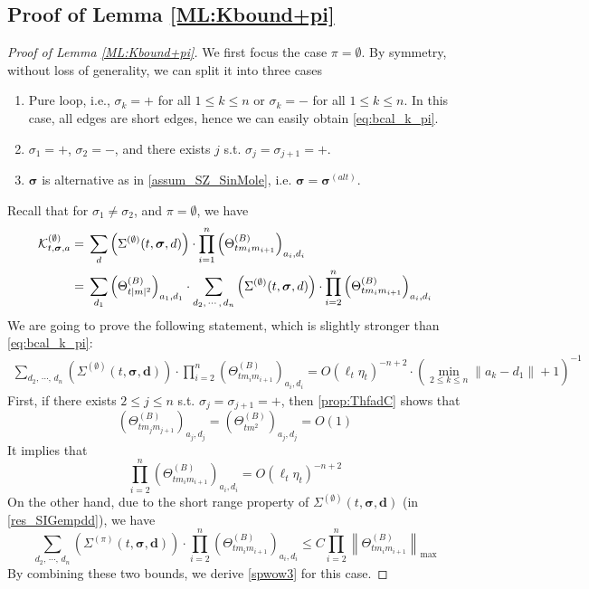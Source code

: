 \documentclass[10pt,reqno]{article}
\theoremstyle{plain} %
\theoremstyle{remark}
\numberwithin{equation}{section}
\begin{document}
\subsection{Proof of Lemma   \ref{ML:Kbound+pi}}

\begin{proof}[Proof of Lemma  \ref{ML:Kbound+pi}]
 We first focus the case $\pi=\emptyset$. By symmetry, without loss of generality, we can split it into three cases
 \begin{enumerate}
     \item Pure loop, i.e., $\sigma_k=+$ for all $1\le k\le n$ or  $\sigma_k=-$ for all $1\le k\le n$. In this case, all edges are short edges, hence we can easily obtain \eqref{eq:bcal_k_pi}. 
     \item $\sigma_1=+$, $\sigma_2=-$, and  there exists $j$ s.t. $\sigma_j=\sigma_{j+1}=+$. 
    \item $\boldsymbol{\sigma}$ is alternative as in \eqref{assum_SZ_SinMole}, i.e. $\boldsymbol{\sigma}=\boldsymbol{\sigma}^{(alt)}$. 
 \end{enumerate}
  Recall  that for $\sigma_1\ne\sigma_2$, and $\pi=\emptyset$, we have 
\begin{align*}
{\cal K}^{(\emptyset)}_{t, \boldsymbol{\sigma}, \textbf{a}}
=\;&
 \sum_{\textbf{d}}\left(\Sigma^{(\emptyset)}(t, \boldsymbol{\sigma}, \textbf{d})\right)
\cdot 
\prod_{i=1}^n \left(\Theta^{(B)}_{tm_im_{i+1}}\right)_{a_i, d_i}
\\\nonumber
=\;&\sum_{d_1}\left(\Theta^{(B)}_{t|m|^2}\right)_{a_1, d_1}
\cdot \sum_{d_2,\,\cdots,\, d_n}\left(\Sigma^{(\emptyset)}(t, \boldsymbol{\sigma}, \textbf{d})\right)
\cdot 
\prod_{i=2}^n \left(\Theta^{(B)}_{tm_im_{i+1}}\right)_{a_i, d_i}  
\end{align*}
We are going to prove the following statement, which is  slightly stronger than \eqref{eq:bcal_k_pi}:
\begin{align}\label{spwow3}
    \sum_{d_2,\,\cdots,\, d_n}\left(\Sigma^{(\emptyset)}(t, \boldsymbol{\sigma}, \textbf{d})\right)
\cdot 
\prod_{i=2}^n \left(\Theta^{(B)}_{tm_im_{i+1}}\right)_{a_i, d_i}
=O(\ell_t\eta_t)^{-n+2}\cdot \left(\min_{2\le k\le n} \|a_k-d_1\|+1\right)^{-1}
\end{align}
First, if there exists $2\le j\le n$ s.t.  $\sigma_j=\sigma_{j+1}=+$, then  \eqref{prop:ThfadC} shows that  
$$
\left(\Theta^{(B)}_{tm_jm_{j+1}}\right)_{a_j, d_j}= \left(\Theta^{(B)}_{tm^2}\right)_{a_j, d_j}=O(1)
$$
It implies that
$$
\prod_{i=2}^n \left(\Theta^{(B)}_{tm_im_{i+1}}\right)_{a_i, d_i}=O(\ell_t\eta_t)^{-n+2}
$$
On the other hand, due to the short range property of $\Sigma^{(\emptyset)}(t, \boldsymbol{\sigma}, \textbf{d})$ (in \eqref{res_SIGempdd}), we have
$$
\sum_{d_2,\,\cdots,\, d_n}\left(\Sigma^{(\pi)}(t, \boldsymbol{\sigma}, \textbf{d})\right)
\cdot 
\prod_{i=2}^n \left(\Theta^{(B)}_{tm_im_{i+1}}\right)_{a_i, d_i}\le C \prod_{i=2}^n \left\|\Theta^{(B)}_{tm_im_{i+1}}\right\|_{\max}
$$
By combining these two bounds, we derive \eqref{spwow3} for this case.



\end{proof}
\end{document}
